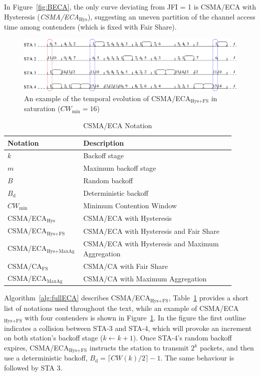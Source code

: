 	In Figure~\ref{fig:BECA}, the only curve deviating from JFI = 1 is CSMA/ECA with Hysteresis (\emph{CSMA/ECA$_{\text{Hys}}$}), suggesting an uneven partition of the channel access time among contenders (which is fixed with Fair Share).
	
	\begin{figure}[tb]
	\centering
		\includegraphics[width=0.8\linewidth]{figures/csma_eca_different_backoff_short.eps}
		\caption{An example of the temporal evolution of CSMA/ECA$_{\text{Hys+FS}}$ in saturation ($CW_{\min}=16$)}
		\label{fig:ECA+Hyst}
	\end{figure}
	
	\begin{table}
		\centering
		\caption{CSMA/ECA Notation}
		\label{tab:glossary}
		\begin{tabular}{|p{0.3\linewidth}|p{0.6\linewidth}|}
			\hline
			{\bfseries Notation} & {\bfseries Description}\\
			\hline
			$k$ & Backoff stage\\
			\hline
			$m$ & Maximum backoff stage\\
			\hline
			$B$ & Random backoff\\
			\hline
			$B_{\text{d}}$ & Deterministic backoff\\
			\hline
			$CW_{\min}$ & Minimum Contention Window\\
			\hline
			CSMA/ECA$_{\text{Hys}}$ & CSMA/ECA with Hysteresis\\
			\hline
			CSMA/ECA$_{\text{Hys+FS}}$ & CSMA/ECA with Hysteresis and Fair Share\\
			\hline
			CSMA/ECA$_{\text{Hys+MaxAg}}$ & CSMA/ECA with Hysteresis and Maximum Aggregation\\
			\hline
			CSMA/CA$_{\text{FS}}$ & CSMA/CA with Fair Share\\
			\hline
			CSMA/ECA$_{\text{MaxAg}}$ & CSMA/CA with Maximum Aggregation\\
			\hline
		\end{tabular}
	\end{table}
	
	
	Algorithm~\ref{alg:fullECA} describes CSMA/ECA$_{\text{Hys+FS}}$, Table~\ref{tab:glossary} provides a short list of notations used throughout the text, while an example of CSMA/ECA$_{\text{Hys+FS}}$ with four contenders is shown in  Figure~\ref{fig:ECA+Hyst}. In the figure the first outline indicates a collision between STA-3 and STA-4, which will provoke an increment on both station's backoff stage ($k\leftarrow k+1$). Once STA-4's random backoff expires, CSMA/ECA$_{\text{Hys+FS}}$ instructs the station to transmit $2^{k}$ packets, and then use a deterministic backoff, $B_{\text{d}}=\lceil CW(k)/2\rceil-1$. The same behaviour is followed by STA 3.
	

